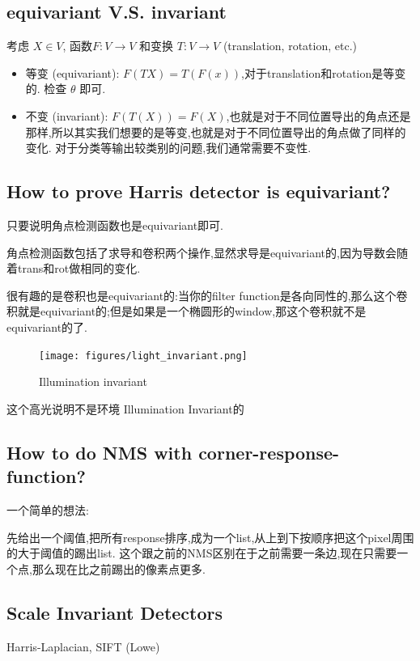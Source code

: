 \subsection{equivariant V.S. invariant}
考虑 $X \in V$, 函数$F: V \to V$ 和变换 $T: V \to V$ (translation, rotation, etc.)
\begin{itemize}
    \item 等变 (equivariant): $F(TX)=T(F(x))$,对于translation和rotation是等变的. 检查 $\theta$ 即可.
    \item 不变 (invariant): $F(T(X))=F(X)$,也就是对于不同位置导出的角点还是那样,所以其实我们想要的是等变,也就是对于不同位置导出的角点做了同样的变化. 对于分类等输出较类别的问题,我们通常需要不变性.
\end{itemize}

\subsection{How to prove Harris detector is equivariant?}

只要说明角点检测函数也是equivariant即可.

角点检测函数包括了求导和卷积两个操作,显然求导是equivariant的,因为导数会随着trans和rot做相同的变化.

很有趣的是卷积也是equivariant的:当你的filter function是各向同性的,那么这个卷积就是equivariant的;但是如果是一个椭圆形的window,那这个卷积就不是equivariant的了.

\begin{figure}[htbp]
    \centering
    \texttt{[image: figures/light\_invariant.png]}
    \caption{Illumination invariant}
\end{figure}

这个高光说明不是环境 Illumination Invariant的

\subsection{How to do NMS with corner-response-function?}

一个简单的想法:

先给出一个阈值,把所有response排序,成为一个list,从上到下按顺序把这个pixel周围的大于阈值的踢出list.
这个跟之前的NMS区别在于之前需要一条边,现在只需要一个点,那么现在比之前踢出的像素点更多.

\subsection{Scale Invariant Detectors}

Harris-Laplacian, SIFT (Lowe)